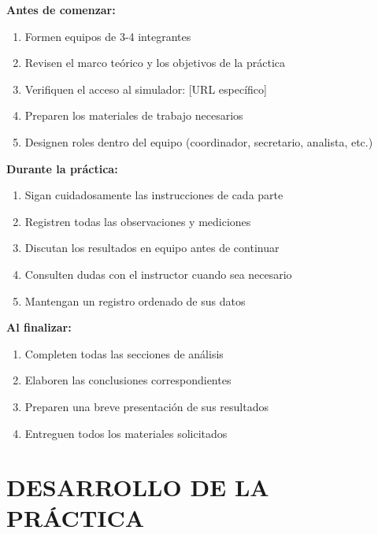 \documentclass[12pt,a4paper]{article}
\begin{document}
	\begin{instruccionbox}
		\textbf{Antes de comenzar:}
		\begin{enumerate}
			\item Formen equipos de 3-4 integrantes
			\item Revisen el marco teórico y los objetivos de la práctica
			\item Verifiquen el acceso al simulador: [URL específico]
			\item Preparen los materiales de trabajo necesarios
			\item Designen roles dentro del equipo (coordinador, secretario, analista, etc.)
		\end{enumerate}
		
		\textbf{Durante la práctica:}
		\begin{enumerate}
			\item Sigan cuidadosamente las instrucciones de cada parte
			\item Registren todas las observaciones y mediciones
			\item Discutan los resultados en equipo antes de continuar
			\item Consulten dudas con el instructor cuando sea necesario
			\item Mantengan un registro ordenado de sus datos
		\end{enumerate}
		
		\textbf{Al finalizar:}
		\begin{enumerate}
			\item Completen todas las secciones de análisis
			\item Elaboren las conclusiones correspondientes
			\item Preparen una breve presentación de sus resultados
			\item Entreguen todos los materiales solicitados
		\end{enumerate}
	\end{instruccionbox}
	
	
	\section{DESARROLLO DE LA PRÁCTICA}
	
	
\end{document}
